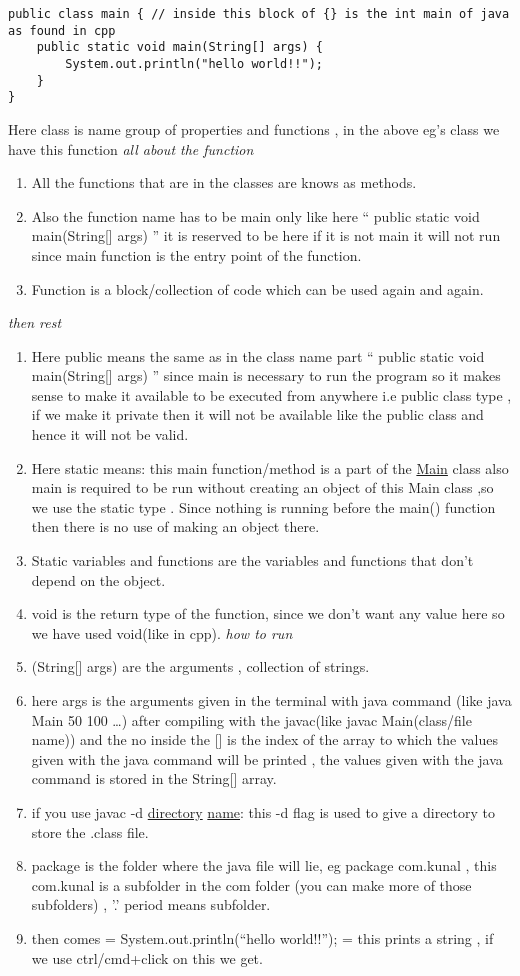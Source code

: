 \documentclass[11pt]{article}
\begin{document}
\begin{verbatim}
public class main { // inside this block of {} is the int main of java as found in cpp
    public static void main(String[] args) {
        System.out.println("hello world!!");
    }
}
\end{verbatim}
Here class is name group of properties and functions , in the above eg's class we have this function
\emph{all about the function}
\begin{enumerate}
\item All the functions that are in the classes are knows as methods.
\item Also the function name has to be main only like here `` public static void main(String[] args) '' it is reserved to be here if it is not main it will not run since main function is the entry point of the function.
\item Function is a block/collection of code which can be used again and again.
\end{enumerate}
\emph{then rest}
\begin{enumerate}
\item Here public means the same as in the class name part `` public static void main(String[] args) '' since main is necessary to run the program so it makes sense to make it available to be executed from anywhere i.e public class type , if we make it private then it will not be available like the public class and hence it will not be valid.
\item Here static means: this main function/method is a part of the \uline{Main} class also main is required to be run without creating an object of this Main class ,so we use the static type . Since nothing is running before the main() function then there is no use of making an object there.
\item Static variables and functions are the variables and functions that don't depend on the object.
\item void is the return type of the function, since we don't want any value here so we have used void(like in cpp).
\emph{how to run}
\item (String[] args) are the arguments , collection of strings.
\item here args is the arguments given in the terminal with java command (like java Main 50 100 \ldots{}) after compiling with the javac(like javac Main(class/file name)) and the no inside the [] is the index of the array to which the values given with the java command will be printed , the values given with the java command is stored in the String[] array.
\item if you use javac -d \uline{directory} \uline{name}: this -d flag is used to give a directory to store the .class file.
\item package is the folder where the java file will lie, eg package com.kunal , this com.kunal is a subfolder in the com folder (you can make more of those subfolders) , '.' period means subfolder.
\item then comes = System.out.println(``hello world!!''); = this prints a string , if we use ctrl/cmd+click on this we get.
\end{enumerate}
\end{document}
